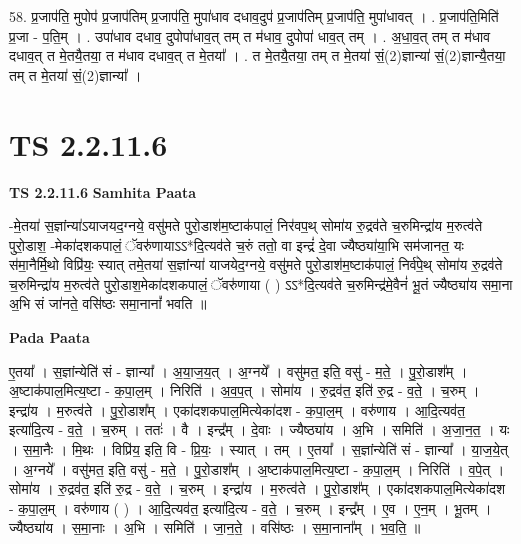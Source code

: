 \documentclass[17pt]{extarticle}
\begin{document}
58. प्र॒जाप॑ति॒ मुपोप॑ प्र॒जाप॑तिम् प्र॒जाप॑ति॒ मुपा॑धाव दधाव॒दुप॑ प्र॒जाप॑तिम् प्र॒जाप॑ति॒ मुपा॑धावत् । . प्र॒जाप॑ति॒मिति॑ प्र॒जा - प॒ति॒म् । . उपा॑धाव दधाव॒ दुपोपा॑धाव॒त् तम् त म॑धाव॒ दुपोपा॑ धाव॒त् तम् । . अ॒धा॒व॒त् तम् त म॑धाव दधाव॒त् त मे॒तयै॒तया॒ त म॑धाव दधाव॒त् त मे॒तया᳚ । . त मे॒तयै॒तया॒ तम् त मे॒तया॑ सं॒(2)ज्ञान्या॑ सं॒(2)ज्ञान्यै॒तया॒ तम् त मे॒तया॑ सं॒(2)ज्ञान्या᳚ । \newline
\pagebreak
{}

\section{ TS 2.2.11.6 }

\textbf{TS 2.2.11.6 } \newline
\textbf{Samhita Paata} \newline

-मे॒तया॑ स॒ज्ञांन्या॑ऽयाजयद॒ग्नये॒ वसु॑मते पुरो॒डाश॑म॒ष्टाक॑पालं॒ निर॑वप॒थ् सोमा॑य रु॒द्रव॑ते च॒रुमिन्द्रा॑य म॒रुत्व॑ते पुरो॒डाश॒ -मेका॑दशकपालं॒ ॅवरु॑णायाऽऽ*दि॒त्यव॑ते च॒रुं ततो॒ वा इन्द्रं॑ दे॒वा ज्यैष्ठ्या॑या॒भि सम॑जानत॒ यः स॑मा॒नैर्मि॒थो विप्रि॑यः॒ स्यात् तमे॒तया॑ स॒ज्ञांन्या॑ याजयेद॒ग्नये॒ वसु॑मते पुरो॒डाश॑म॒ष्टाक॑पालं॒ निर्व॑पे॒थ् सोमा॑य रु॒द्रव॑ते च॒रुमिन्द्रा॑य म॒रुत्व॑ते पुरो॒डाश॒मेका॑दशकपालं॒ ॅवरु॑णाया ( ) ऽऽ*दि॒त्यव॑ते च॒रुमिन्द्र॑मे॒वैनं॑ भू॒तं ज्यैष्ठ्या॑य समा॒ना अ॒भि सं जा॑नते॒ वसि॑ष्ठः समा॒नानां᳚ भवति ॥ \newline

\textbf{Pada Paata} \newline

ए॒तया᳚ । स॒ज्ञांन्येति॑ सं - ज्ञान्या᳚ । अ॒या॒ज॒य॒त् । अ॒ग्नये᳚ । वसु॑मत॒ इति॒ वसु॑ - म॒ते॒ । पु॒रो॒डाश᳚म् । अ॒ष्टाक॑पाल॒मित्य॒ष्टा - क॒पा॒ल॒म् । निरिति॑ । अ॒व॒प॒त् । सोमा॑य । रु॒द्रव॑त॒ इति॑ रु॒द्र - व॒ते॒ । च॒रुम् । इन्द्रा॑य । म॒रुत्व॑ते । पु॒रो॒डाश᳚म् । एका॑दशकपाल॒मित्येका॑दश - क॒पा॒ल॒म् । वरु॑णाय । आ॒दि॒त्यव॑त॒ इत्या॑दि॒त्य - व॒ते॒ । च॒रुम् । ततः॑ । वै । इन्द्र᳚म् । दे॒वाः । ज्यैष्ठ्या॑य । अ॒भि । समिति॑ । अ॒जा॒न॒त॒ । यः । स॒मा॒नैः । मि॒थः । विप्रि॑य॒ इति॒ वि - प्रि॒यः॒ । स्यात् । तम् । ए॒तया᳚ । स॒ज्ञांन्येति॑ सं - ज्ञान्या᳚ । या॒ज॒ये॒त् । अ॒ग्नये᳚ । वसु॑मत॒ इति॒ वसु॑ - म॒ते॒ । पु॒रो॒डाश᳚म् । अ॒ष्टाक॑पाल॒मित्य॒ष्टा - क॒पा॒ल॒म् । निरिति॑ । व॒पे॒त् । सोमा॑य । रु॒द्रव॑त॒ इति॑ रु॒द्र - व॒ते॒ । च॒रुम् । इन्द्रा॑य । म॒रुत्व॑ते । पु॒रो॒डाश᳚म् । एका॑दशकपाल॒मित्येका॑दश - क॒पा॒ल॒म् । वरु॑णाय ( ) । आ॒दि॒त्यव॑त॒ इत्या॑दि॒त्य - व॒ते॒ । च॒रुम् । इन्द्र᳚म् । ए॒व । ए॒न॒म् । भू॒तम् । ज्यैष्ठ्या॑य । स॒मा॒नाः । अ॒भि । समिति॑ । जा॒न॒ते॒ । वसि॑ष्ठः । स॒मा॒नाना᳚म् । भ॒व॒ति॒ ॥  \newline
\end{document}
